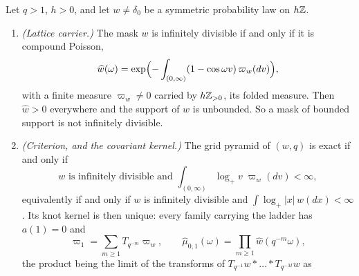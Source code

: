 \begin{proposition}
\label{prop:grid-pyramids-infinitely-divisible}
\leanok
Let $q > 1$, $h > 0$, and let $w \ne \delta_0$ be a symmetric probability law on $h\mathbb{Z}$.
\begin{enumerate}
\item \emph{(Lattice carrier.)} The mask $w$ is infinitely divisible if and only if it is compound
Poisson,
\[
  \widehat w(\omega) = \exp\Bigl(-\int_{(0,\infty)}(1 - \cos\omega v)\,\varpi_w(dv)\Bigr),
\]
with a finite measure $\varpi_w \ne 0$ carried by $h\mathbb{Z}_{>0}$, its folded \Levy{} measure. Then
$\widehat w > 0$ everywhere and the support of $w$ is unbounded. So a mask of bounded support is
not infinitely divisible.
\item \emph{(Criterion, and the covariant kernel.)} The grid pyramid of $(w, q)$ is exact if
and only if
\begin{equation}
\label{eq:grid-pyramid-criterion}
  w \text{ is infinitely divisible and } \int_{(0,\infty)}\log_+v\;\varpi_w(dv) < \infty ,
\end{equation}
equivalently if and only if $w$ is infinitely divisible and $\int\log_+|x|\,w(dx) < \infty$. Its
knot kernel is then unique: every family carrying the ladder has $a(1) = 0$ and
\begin{equation}
\label{eq:grid-pyramid-knot-kernel}
  \varpi_1 = \sum_{m \ge 1}T_{q^{-m}}\varpi_w, \qquad
  \widehat\mu_{0,1}(\omega) = \prod_{m \ge 1}\widehat w(q^{-m}\omega),
\end{equation}
the product being the limit of the transforms of $T_{q^{-1}}w * \dots * T_{q^{-M}}w$ as

\end{enumerate}
\end{proposition}

